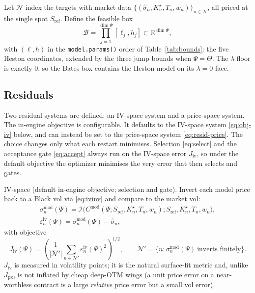 \documentclass[a4paper, 11pt, reqno]{amsart}
\makeatletter
\def\paragraph{\@startsection{paragraph}{4}%
	\z@\z@{-\fontdimen2\font}%
	{\normalfont\bfseries}}
\newcommand{\Real}{\mathbb{R}}
\makeatother
\begin{document}
		Let $\mathcal{N}$ index the targets with market data $\{(\hat\sigma_n, K^\star_n, T_n, w_n)\}_{n\in\mathcal{N}}$,
		all priced at the single spot $S_{\mathrm{ref}}$. Define the feasible box
		\begin{equation}\label{eq:box}
			\mathcal{B} = \prod_{j=1}^{\dim\Psi} [\ell_j, h_j] \subset \Real^{\dim\Psi},
		\end{equation}
		with $(\ell,h)$ in the \texttt{model.params()} order of Table~\ref{tab:bounds}: the five Heston
		coordinates, extended by the three jump bounds when $\Psi=\Theta$. The $\lambda$ floor is exactly
		$0$, so the Bates box contains the Heston model on its $\lambda=0$ face.
		
		\subsection{Residuals}
			Two residual systems are defined: an IV-space system and a price-space system. The in-engine
			objective is configurable. It defaults to the IV-space system \eqref{eq:obj-iv} below, and can
			instead be set to the price-space system \eqref{eq:resid-price}. The choice changes only what
			each restart minimises. Selection \eqref{eq:select} and the acceptance gate \eqref{eq:accept}
			always run on the IV-space error $J_{\mathrm{iv}}$, so under the default objective the optimizer
			minimises the very error that then selects and gates.
			
			\paragraph{IV-space (default in-engine objective; selection and gate).} Invert each model price back to a Black vol via
				\eqref{eq:ivinv} and compare to the market vol:
				\begin{equation}\label{eq:resid-iv}
					\begin{gathered}
						\sigma^{\mathrm{mod}}_n(\Psi) = \mathcal{I}\bigl( C^{\mathrm{mod}}(\Psi; S_{\mathrm{ref}}, K^\star_n, T_n, w_n);
						S_{\mathrm{ref}}, K^\star_n, T_n, w_n \bigr), \\
						\varepsilon^{\mathrm{iv}}_n(\Psi) = \sigma^{\mathrm{mod}}_n(\Psi) - \hat\sigma_n,
					\end{gathered}
				\end{equation}
				with objective
				\begin{equation}\label{eq:obj-iv}
					J_{\mathrm{iv}}(\Psi)
					= \left( \frac{1}{|\mathcal{N}'|} \sum_{n\in\mathcal{N}'} \varepsilon^{\mathrm{iv}}_n(\Psi)^2 \right)^{1/2},
					\qquad \mathcal{N}' = \{ n : \sigma^{\mathrm{mod}}_n(\Psi)\ \text{inverts finitely} \}.
				\end{equation}
				$J_{\mathrm{iv}}$ is measured in volatility points; it is the natural surface-fit metric and,
				unlike $J_{\mathrm{px}}$, is not inflated by cheap deep-OTM wings (a unit price error on a
				near-worthless contract is a large \emph{relative} price error but a small vol error).
				
\end{document}
